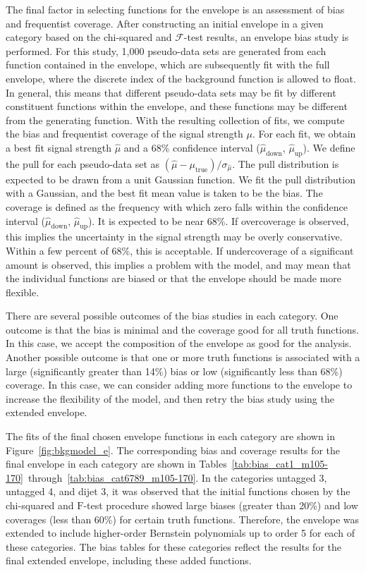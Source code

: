 The final factor in selecting functions for the envelope is an assessment of bias and frequentist coverage. 
After constructing an initial envelope in a given 
category based on the chi-squared and $\mathcal{F}$-test results, an envelope bias study is performed. 
For this study, 1,000 pseudo-data sets are generated from each function contained in the envelope, which are subsequently fit with the full envelope, where 
the discrete index of the background function is allowed to float. 
In general, this means that different pseudo-data sets may be fit by different 
constituent functions within the envelope, and these functions may be different from the generating function. 
With the resulting collection of fits, we compute the bias and frequentist coverage of the signal strength $\mu$. 
For each fit, we obtain a best fit signal strength $\hat{\mu}$ and a 68\% confidence interval
($\hat{\mu}_{\mathrm{down}}$, $\hat{\mu}_{\mathrm{up}}$). We define the pull for each pseudo-data set as 
$(\hat{\mu}-\mu_{\mathrm{true}})/\sigma_{\hat{\mu}}$. 
The pull distribution is expected to be drawn from a unit Gaussian function. 
We fit the pull distribution with a Gaussian, and the best fit mean 
value is taken to be the bias. The coverage is defined as the frequency with which zero falls
within the confidence interval ($\hat{\mu}_{\mathrm{down}}$, $\hat{\mu}_{\mathrm{up}}$). It is expected to be 
near 68\%. If overcoverage is observed, this implies the uncertainty in the signal strength may 
be overly conservative. Within a few percent of 68\%, this is acceptable. If undercoverage of 
a significant amount is observed, this implies a problem with the model, and may mean that 
the individual functions are biased or that the envelope should be made more flexible. 

There are several possible outcomes of the bias studies in each 
category. One outcome is that the bias is minimal and the coverage good for all 
truth functions. In this case, we accept the composition of the envelope as good 
for the analysis. Another possible outcome is that one or more truth functions is 
associated with a large (significantly greater than 14\%) bias or low 
(significantly less than 68\%) coverage. In this case, we can consider adding 
more functions to the envelope to increase the flexibility of the model, and then 
retry the bias study using the extended envelope. 

The fits of the final chosen envelope functions in each category are shown in Figure~\ref{fig:bkgmodel_e}.
The corresponding bias and coverage results for the final envelope in each category 
are shown in Tables~\ref{tab:bias_cat1_m105-170}~through~\ref{tab:bias_cat6789_m105-170}. 
In the categories untagged 3, untagged 4, and dijet 3, it was observed that the initial functions chosen 
by the chi-squared and $\mathrm{F}$-test procedure showed large biases (greater than 20\%) and low coverages (less than 60\%) for 
certain truth functions. Therefore, the envelope was extended to include higher-order Bernstein polynomials up 
to order 5 for each of these categories. The bias tables for these categories reflect the results for the final 
extended envelope, including these added functions. 

